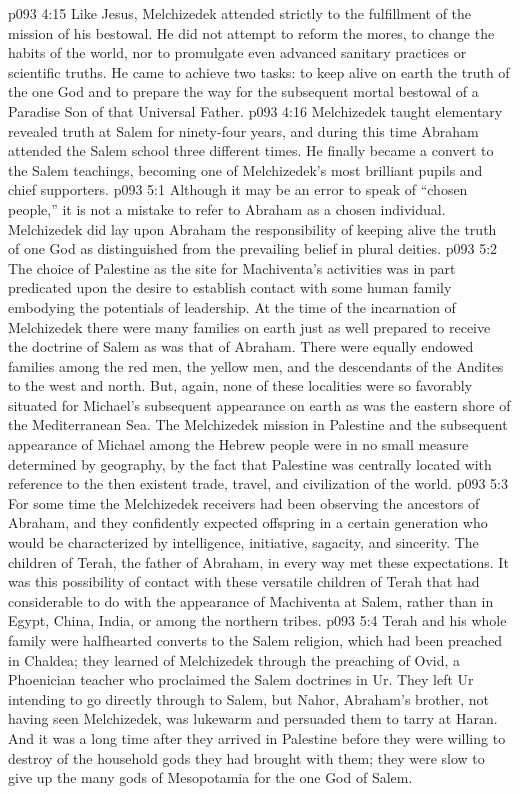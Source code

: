 \vs p093 4:15 Like Jesus, Melchizedek attended strictly to the fulfillment of the mission of his bestowal. He did not attempt to reform the mores, to change the habits of the world, nor to promulgate even advanced sanitary practices or scientific truths. He came to achieve two tasks: to keep alive on earth the truth of the one God and to prepare the way for the subsequent mortal bestowal of a Paradise Son of that Universal Father.
\pc \vs p093 4:16 Melchizedek taught elementary revealed truth at Salem for ninety\hyp{}four years, and during this time Abraham attended the Salem school three different times. He finally became a convert to the Salem teachings, becoming one of Melchizedek’s most brilliant pupils and chief supporters.
\vs p093 5:1 Although it may be an error to speak of “chosen people,” it is not a mistake to refer to Abraham as a chosen individual. Melchizedek did lay upon Abraham the responsibility of keeping alive the truth of one God as distinguished from the prevailing belief in plural deities.
\vs p093 5:2 The choice of Palestine as the site for Machiventa’s activities was in part predicated upon the desire to establish contact with some human family embodying the potentials of leadership. At the time of the incarnation of Melchizedek there were many families on earth just as well prepared to receive the doctrine of Salem as was that of Abraham. There were equally endowed families among the red men, the yellow men, and the descendants of the Andites to the west and north. But, again, none of these localities were so favorably situated for Michael’s subsequent appearance on earth as was the eastern shore of the Mediterranean Sea. The Melchizedek mission in Palestine and the subsequent appearance of Michael among the Hebrew people were in no small measure determined by geography, by the fact that Palestine was centrally located with reference to the then existent trade, travel, and civilization of the world.
\vs p093 5:3 For some time the Melchizedek receivers had been observing the ancestors of Abraham, and they confidently expected offspring in a certain generation who would be characterized by intelligence, initiative, sagacity, and sincerity. The children of Terah, the father of Abraham, in every way met these expectations. It was this possibility of contact with these versatile children of Terah that had considerable to do with the appearance of Machiventa at Salem, rather than in Egypt, China, India, or among the northern tribes.
\vs p093 5:4 Terah and his whole family were halfhearted converts to the Salem religion, which had been preached in Chaldea; they learned of Melchizedek through the preaching of Ovid, a Phoenician teacher who proclaimed the Salem doctrines in Ur. They left Ur intending to go directly through to Salem, but Nahor, Abraham’s brother, not having seen Melchizedek, was lukewarm and persuaded them to tarry at Haran. And it was a long time after they arrived in Palestine before they were willing to destroy  of the household gods they had brought with them; they were slow to give up the many gods of Mesopotamia for the one God of Salem.
